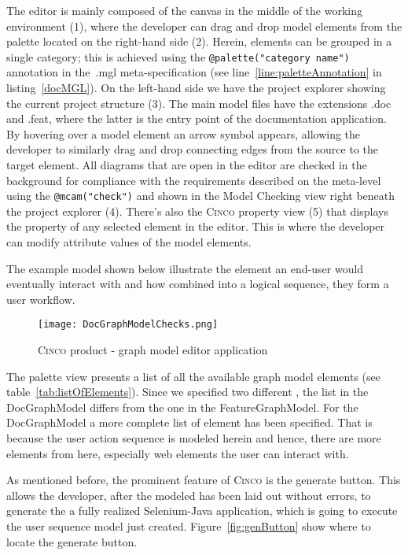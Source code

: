 The editor is mainly composed of the canvas in the middle of the working environment (1), where the developer can drag and drop model elements from the palette located on the right-hand side (2). Herein, elements can be grouped in a single category; this is achieved using the \lstinline[language=MGL]{@palette("category name")} annotation in the~.mgl meta-specification (see line~\ref{line:paletteAnnotation} in listing~\ref{docMGL}). On the left-hand side we have the project explorer showing the current project structure (3). The main model files have the extensions .doc and .feat, where the latter is the entry point of the documentation application. By hovering over a model element an arrow symbol appears, allowing the developer to similarly drag and drop connecting edges from the source to the target element. All diagrams that are open in the editor are checked in the background for compliance with the requirements described on the meta-level using the \lstinline[language=MGL]{@mcam("check")} and shown in the Model Checking view right beneath the project explorer (4). There's also the \textsc{Cinco} property view (5) that displays the property of any selected element in the editor. This is where the developer can modify attribute values of the model elements.

The example model shown below illustrate the element an end-user would eventually interact with and how combined into a logical sequence, they form a user workflow. 

\begin{figure}[H]
    \centering
    \texttt{[image: DocGraphModelChecks.png]}
    \caption{\textsc{Cinco} product - graph model editor application}\label{fig:graphDSL}
\end{figure}

The palette view presents a list of all the available graph model elements (see table~\ref{tab:listOfElements}). Since we specified two different , the list in the DocGraphModel differs from the one in the FeatureGraphModel. For the DocGraphModel a more complete list of element has been specified. That is because the user action sequence is modeled herein and hence, there are more elements from here, especially web elements the user can interact with.

As mentioned before, the prominent feature of \textsc{Cinco} is the generate button. This allows the developer, after the modeled has been laid out without errors, to generate the a fully realized Selenium-Java application, which is going to execute the user sequence model just created. Figure~\ref{fig:genButton} show where to locate the generate button.

